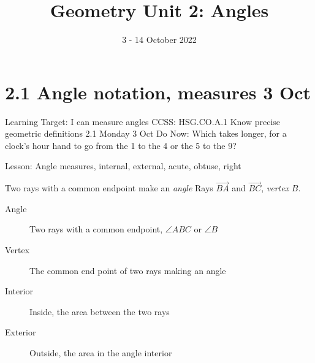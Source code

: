 \documentclass[onlytextwidth]{beamer}
\title{Geometry Unit 2: Angles}
\date{3 - 14 October 2022}
\begin{document}
\frame{\titlepage}

\section[Outline]{}
\frame{\tableofcontents}

\section{2.1 Angle notation, measures \hfill 3 Oct}
\begin{frame}{Learning Target: I can measure angles}
  {CCSS: HSG.CO.A.1 Know precise geometric definitions \hfill \alert{2.1 Monday 3 Oct}}
  Do Now: Which takes longer, for a clock's hour hand to go from the 1 to the 4 or the 5 to the 9? \par \bigskip
     \par \bigskip
  Lesson: Angle measures, internal, external, acute, obtuse, right
\end{frame}

\begin{frame}{Two rays with a common endpoint make an \emph{angle}}
  Rays $\overrightarrow{BA}$ and $\overrightarrow{BC}$, \emph{vertex} $B$. \par \bigskip
    \begin{description}
      \item[Angle] Two rays with a common endpoint, $\angle ABC$ or $\angle B$
      \item[Vertex] The common end point of two rays making an angle
      \item[Interior] Inside, the area between the two rays
      \item[Exterior] Outside, the area in the angle interior 
    \end{description}
  \end{frame}
\end{document}
